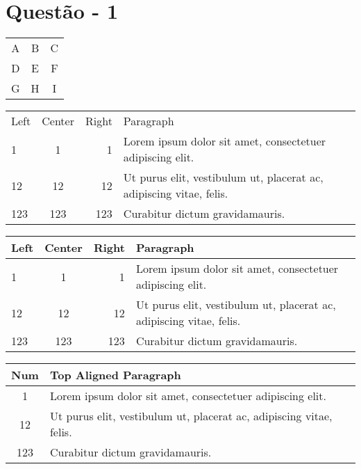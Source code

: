 \documentclass[
   article,       %
   12pt,          %
   oneside,       %
   a4paper,       %
   english,       %
   brazil,           %
   sumario=tradicional
   ]{abntex2}
\begin{document}

\frenchspacing 

\maketitle

\textual


\newpage

\section{Questão - 1}




\begin{tabular}{c c c}
    A & B & C \\
    D & E & F \\
    G & H & I \\
\end{tabular}


\begin{tabular}{||l|c|r|p{6cm}||}
    Left & Center & Right & Paragraph \\
    1 & 1 & 1 & Lorem ipsum dolor sit amet, consectetuer adipiscing elit. \\
    12 & 12 & 12 & Ut purus elit, vestibulum ut, placerat ac, adipiscing vitae, felis. \\
    123 & 123 & 123 & Curabitur dictum gravidamauris. \\
\end{tabular}



\begin{tabular}{||l|c|r|p{6cm}||}
    \cline{1-3}
    Left & Center & Right & Paragraph \\
    \hline \hline
    1 & 1 & 1 & Lorem ipsum dolor sit amet, consectetuer adipiscing elit. \\
    \hline
    12 & 12 & 12 & Ut purus elit, vestibulum ut, placerat ac, adipiscing vitae, felis. \\
    \hline
    123 & 123 & 123 & Curabitur dictum gravidamauris. \\ [.3cm]
    \cline{4-4}
\end{tabular}


\begin{tabular}{|c|p{6cm}|}
    \hline
    Num & Top Aligned Paragraph\\
    \hline
    1 & Lorem ipsum dolor sit amet, consectetuer adipiscing elit. \\
    \hline
    12 & Ut purus elit, vestibulum ut, placerat ac, adipiscing vitae, felis. \\
    \hline
    123 & Curabitur dictum gravidamauris. \\
    \hline
\end{tabular}
\end{document}
